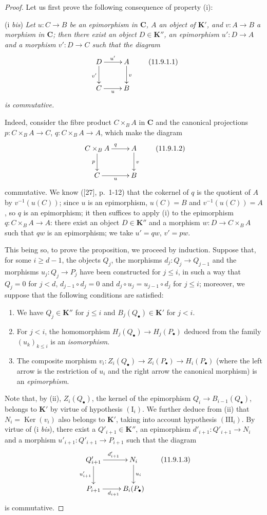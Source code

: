 \begin{proof}
Let us first prove the following consequence of property (i):

(i \emph{bis}) \emph{Let $u:C\to B$ be an epimorphism in $\boldsymbol{C}$, $A$ an
object of $\boldsymbol{K}'$, and $v:A\to B$ a morphism in $\boldsymbol{C}$; then there exist an
object $D\in\boldsymbol{K}''$, an epimorphism $u':D\to A$ and a morphism $v':D\to C$
such that the diagram}
\[
\xymatrix{
D\ar[r]^{u'}\ar[d]_{v'} & A\ar[d]^{v}\\
C\ar[r]_{u} & B
}
\tag{11.9.1.1}\label{0.11.9.1.1}
\]
\emph{is commutative.}

Indeed, consider the fibre product $C\times_B A$ in $\boldsymbol{C}$ and the
canonical projections $p:C\times_B A\to C$, $q:C\times_B A\to A$, which make
the diagram
\[
\xymatrix{
C\times_B A\ar[r]^{q}\ar[d]_{p} & A\ar[d]^{v}\\
C\ar[r]_{u} & B
}
\tag{11.9.1.2}\label{0.11.9.1.2}
\]
commutative. We know ([27], p.~1-12) that the cokernel of $q$ is the
quotient of $A$ by $v^{-1}(u(C))$; since $u$ is an epimorphism, $u(C)=B$ and
$v^{-1}(u(C))=A$, so $q$ is an epimorphism; it then suffices to apply
(i) to the epimorphism $q:C\times_B A\to A$: there exist an object
$D\in\boldsymbol{K}''$ and a morphism $w:D\to C\times_B A$ such that $qw$ is an
epimorphism; we take $u'=qw$, $v'=pw$.

This being so, to prove the proposition, we proceed by induction.
Suppose that, for some $i\geq d-1$, the objects $Q_j$, the morphisms
$d_j:Q_j\to Q_{j-1}$ and the morphisms $u_j:Q_j\to P_j$ have been
constructed for $j\leq i$, in such a way that $Q_j=0$ for $j<d$,
$d_{j-1}\circ d_j=0$ and
$d_j\circ u_j=u_{j-1}\circ d_j$ for $j\leq i$; moreover, we suppose that
the following conditions are satisfied:
\begin{enumerate}
\item[$(\mathrm I_i)$] We have $Q_j\in\boldsymbol{K}''$ for $j\leq i$ and
$B_j(Q_\bullet)\in\boldsymbol{K}'$ for $j<i$.
\item[$(\mathrm{II}_i)$] For $j<i$, the homomorphism
$H_j(Q_\bullet)\to H_j(P_\bullet)$ deduced from the family $(u_k)_{k\leq i}$
is an \emph{isomorphism}.
\item[$(\mathrm{III}_i)$] The composite morphism $v_i:Z_i(Q_\bullet)\to Z_i(P_\bullet)
\to H_i(P_\bullet)$
(where the left arrow is the restriction of $u_i$ and the right arrow
the canonical morphism) is an \emph{epimorphism}.
\end{enumerate}
Note that, by (ii), $Z_i(Q_\bullet)$, the kernel of the epimorphism
$Q_i\to B_{i-1}(Q_\bullet)$, belongs to $\boldsymbol{K}'$ by virtue of hypothesis
$(\mathrm I_i)$. We further deduce from (ii) that
$N_i=\operatorname{Ker}(v_i)$ also belongs to $\boldsymbol{K}'$, taking into account
hypothesis $(\mathrm{III}_i)$. By virtue of (i \emph{bis}), there exist a
$Q'_{i+1}\in\boldsymbol{K}''$, an epimorphism $d'_{i+1}:Q'_{i+1}\to N_i$ and a
morphism $u'_{i+1}:Q'_{i+1}\to P_{i+1}$ such that the diagram
\[
\xymatrix{
Q'_{i+1}\ar[r]^{d'_{i+1}}\ar[d]_{u'_{i+1}} &
N_i\ar[d]^{u_i}\\
P_{i+1}\ar[r]_{d_{i+1}} & B_i(P_\bullet)
}
\tag{11.9.1.3}\label{0.11.9.1.3}
\]
is commutative.


\end{proof}
